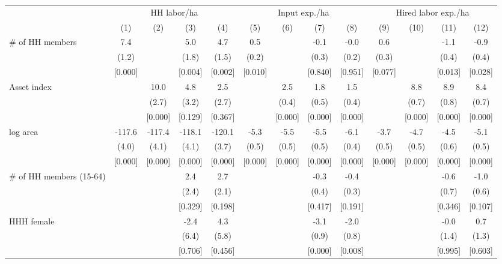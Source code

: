 \begin{tabular}{lcccccccccccc}
\hline \hline
 & \multicolumn{4}{c}{HH labor/ha} & \multicolumn{4}{c}{Input exp./ha} & \multicolumn{4}{c}{Hired labor exp./ha} \\
\cmidrule(lr){2-5}\cmidrule(lr){6-9}\cmidrule(lr){10-13}
 & (1) & (2) & (3) & (4) & (5) & (6) & (7) & (8) & (9) & (10) & (11) & (12) \\
\hline
\# of HH members & 7.4 &  & 5.0 & 4.7 & 0.5 &  & -0.1\hphantom{-} & -0.0\hphantom{-} & 0.6 &  & -1.1\hphantom{-} & -0.9\hphantom{-} \\
 & (1.2) &  & (1.8) & (1.5) & (0.2) &  & (0.3) & (0.2) & (0.3) &  & (0.4) & (0.4) \\
 & [0.000] &  & [0.004] & [0.002] & [0.010] &  & [0.840] & [0.951] & [0.077] &  & [0.013] & [0.028] \\
Asset index &  & 10.0 & 4.8 & 2.5 &  & 2.5 & 1.8 & 1.5 &  & 8.8 & 8.9 & 8.4 \\
 &  & (2.7) & (3.2) & (2.7) &  & (0.4) & (0.5) & (0.4) &  & (0.7) & (0.8) & (0.7) \\
 &  & [0.000] & [0.129] & [0.367] &  & [0.000] & [0.000] & [0.000] &  & [0.000] & [0.000] & [0.000] \\
log area & -117.6\hphantom{-} & -117.4\hphantom{-} & -118.1\hphantom{-} & -120.1\hphantom{-} & -5.3\hphantom{-} & -5.5\hphantom{-} & -5.5\hphantom{-} & -6.1\hphantom{-} & -3.7\hphantom{-} & -4.7\hphantom{-} & -4.5\hphantom{-} & -5.1\hphantom{-} \\
 & (4.0) & (4.1) & (4.1) & (3.7) & (0.5) & (0.5) & (0.5) & (0.4) & (0.5) & (0.5) & (0.6) & (0.5) \\
 & [0.000] & [0.000] & [0.000] & [0.000] & [0.000] & [0.000] & [0.000] & [0.000] & [0.000] & [0.000] & [0.000] & [0.000] \\
\# of HH members (15-64) &  &  & 2.4 & 2.7 &  &  & -0.3\hphantom{-} & -0.4\hphantom{-} &  &  & -0.6\hphantom{-} & -1.0\hphantom{-} \\
 &  &  & (2.4) & (2.1) &  &  & (0.4) & (0.3) &  &  & (0.7) & (0.6) \\
 &  &  & [0.329] & [0.198] &  &  & [0.417] & [0.191] &  &  & [0.346] & [0.107] \\
HHH female &  &  & -2.4\hphantom{-} & 4.3 &  &  & -3.1\hphantom{-} & -2.0\hphantom{-} &  &  & -0.0\hphantom{-} & 0.7 \\
 &  &  & (6.4) & (5.8) &  &  & (0.9) & (0.8) &  &  & (1.4) & (1.3) \\
 &  &  & [0.706] & [0.456] &  &  & [0.000] & [0.008] &  &  & [0.995] & [0.603] \\

\end{tabular}
